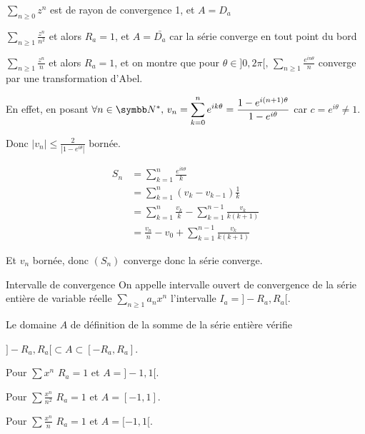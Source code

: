 \begin{exemple}
    $\sum_{n \geqslant 0} z^n$ est de rayon de convergence 1, et $A = D_a$

    \lvspace $\sum_{n \geqslant 1} \frac{z^n }{n^2 }$ et alors $R_a = 1$, et $A = \bar{D_a}$ car la série converge en tout point du bord

    \lvspace $\sum_{n \geqslant 1} \frac{z^n }{n }$ et alors $R_a = 1$, et on montre que pour 
    $\theta \in ]0, 2 \pi[, \, \sum_{n \geqslant 1} \frac{e^{i n \theta}}{n}$ converge par une transformation d'Abel.

    En effet, en posant $\forall n \in \N^*, \, v_n = \displaystyle \sum_{k = 0 }^{n } e^{i k \theta} = \frac{1 - e^{i (n + 1) \theta}}{1 - e^{i \theta}}$
    car $c = e^{i \theta} \neq 1$. 
    
    Donc $\displaystyle \left| v_n \right| \leqslant \frac 2 {\left| 1 - e ^{i \theta} \right|}$ bornée.

    \begin{align}
        S_n & = \sum_{k = 1}^n \frac{e^{i k \theta}}{k} \\
        & = \sum_{k = 1}^n \left( v_k - v_{k - 1} \right) \frac 1 k \\
        & = \sum_{k = 1}^{n} \frac{v_k} k - \sum_{k = 1}^{n - 1} \frac{v_k}{k(k + 1)}\\
        & = \frac{v_n} n - v_0 + \sum_{k = 1}^{n - 1} \frac{v_k}{k(k + 1)} 
    \end{align}

    Et $v_n$ bornée, donc $(S_n)$ converge donc la série converge. 
\end{exemple}

\begin{definition}{Intervalle de convergence}{}
    On appelle intervalle ouvert de convergence de la série entière de variable 
    réelle $\sum_{n \geqslant 1} a_n x^n$ l'intervalle $I_a = ]-R_a, R_a[$.

    Le domaine $A$ de définition de la somme de la série entière vérifie 
    
    $] - R_a, R_a [ \subset A \subset [ - R_a, R_a ]$.
\end{definition}

\begin{exemple}
    Pour $\displaystyle \sum x^n$ $R_a = 1$ et $A = ]-1, 1[$.

    \lvspace Pour $\displaystyle \sum \frac{x^n}{n^2}$ $R_a = 1$ et $A = [ -1, 1 ]$.

    \lvspace Pour $\displaystyle \sum \frac{x^n}{n}$ $R_a = 1$ et $A = [ -1, 1 [ $.
\end{exemple}


